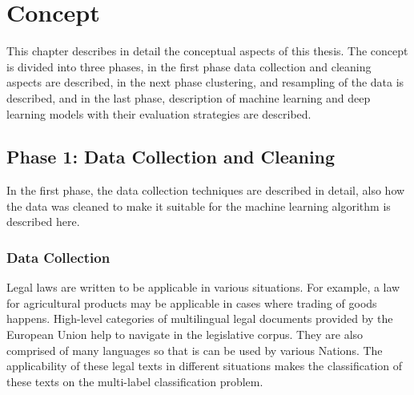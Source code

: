 \chapter{Concept}
\label{ch:concept}

This chapter describes in detail the conceptual aspects of this thesis. The concept is divided into three phases, in the first phase data collection and cleaning aspects are described, in the next phase clustering, and resampling of the data is described, and in the last phase, description of machine learning and deep learning models with their evaluation strategies are described.

\section{Phase 1: Data Collection and Cleaning}
In the first phase, the data collection techniques are described in detail, also how the data was cleaned to make it suitable for the machine learning algorithm is described here. 

\subsection*{Data Collection}
Legal laws are written to be applicable in various situations. For example, a law for agricultural products may be applicable in cases where trading of goods happens.  High-level categories of multilingual legal documents provided by the European Union help to navigate in the legislative corpus. They are also comprised of many languages so that is can be used by various Nations. The applicability of these legal texts in different situations makes the classification of these texts on the multi-label classification problem.


